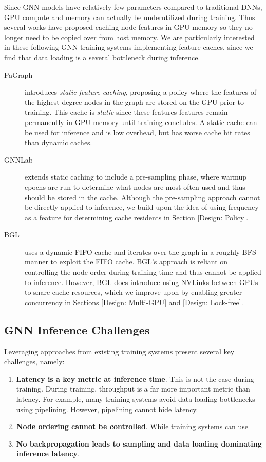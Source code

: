 Since GNN models have relatively few parameters compared to traditional DNNs, GPU compute and memory can actually be underutilized during training. Thus several works have proposed caching node features in GPU memory so they no longer need to be copied over from host memory. We are particularly interested in these following GNN training systems implementing feature caches, since we find that data loading is a several bottleneck during inference.

\begin{description}
    \item[PaGraph \cite{PaGraph_2020}] introduces \textit{static feature caching}, proposing a policy where the features of the highest degree nodes in the graph are stored on the GPU prior to training. This cache is \textit{static} since these features features remain permanently in GPU memory until training concludes. A static cache can be used for inference and is low overhead, but has worse cache hit rates than dynamic caches.
    \item[GNNLab \cite{GNNLab_2022}] extends static caching to include a pre-sampling phase, where warmup epochs are run to determine what nodes are most often used and thus should be stored in the cache. Although the pre-sampling approach cannot be directly applied to inference, we build upon the idea of using frequency as a feature for determining cache residents in Section \ref{Design: Policy}.
    \item[BGL \cite{BGL_2023}] uses a dynamic FIFO cache and iterates over the graph in a roughly-BFS manner to exploit the FIFO cache. BGL's approach is reliant on controlling the node order during training time and thus cannot be applied to inference. However, BGL does introduce using NVLinks between GPUs to share cache resources, which we improve upon by enabling greater concurrency in Sections \ref{Design: Multi-GPU} and \ref{Design: Lock-free}.
\end{description}

\subsection{GNN Inference Challenges}
Leveraging approaches from existing training systems present several key challenges, namely:

\begin{enumerate}
    \item \textbf{Latency is a key metric at inference time}. This is not the case during training. During training, throughput is a far more important metric than latency. For example, many training systems avoid data loading bottlenecks using pipelining. However, pipelining cannot hide latency.
    \item \textbf{Node ordering cannot be controlled}. While training systems can use 
    \item \textbf{No backpropagation leads to sampling and data loading dominating inference latency}. 
\end{enumerate}

